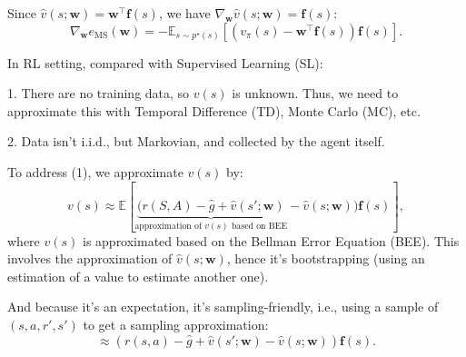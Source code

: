 Since \(\hat{v}(s;\mathbf{w}) = \mathbf{w}^\top \mathbf{f}(s)\), we have \(\nabla_{\mathbf{w}} \hat{v}(s;\mathbf{w}) = \mathbf{f}(s)\):
\[
\nabla_{\mathbf{w}} e_{\text{MS}}(\mathbf{w}) = - \mathbb{E}_{s \sim p^\star(s)}\left[\left(v_\pi(s) - \mathbf{w}^\top \mathbf{f}(s)\right) \mathbf{f}(s)\right].
\]

In RL setting, compared with Supervised Learning (SL):

1. There are no training data, so \(v(s)\) is unknown. Thus, we need to approximate this with Temporal Difference (TD), Monte Carlo (MC), etc.

2. Data isn't i.i.d., but Markovian, and collected by the agent itself.

To address (1), we approximate \(v(s)\) by:
\[
v(s) \approx \mathbb{E}\left[\underbrace{(r(S, A) - \hat{g} + \hat{v}(s'; \mathbf{w})}_{\text{approximation of } v(s) \text{ based on BEE}} - \hat{v}(s; \mathbf{w})) \mathbf{f}(s)\right],
\]
where \(v(s)\) is approximated based on the Bellman Error Equation (BEE). This involves the approximation of \(\hat{v}(s; \mathbf{w})\), hence it's bootstrapping (using an estimation of a value to estimate another one).

And because it's an expectation, it's sampling-friendly, i.e., using a sample of \((s, a, r', s')\) to get a sampling approximation:
\[
    \approx \left(r(s, a) - \hat{g} + \hat{v}(s'; \mathbf{w}) - \hat{v}(s; \mathbf{w})\right) \mathbf{f}(s).
\]